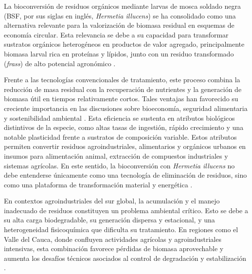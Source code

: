 La bioconversión de residuos orgánicos mediante larvas de mosca soldado negra (BSF, por sus siglas en inglés, \textit{Hermetia illucens}) se ha consolidado como una alternativa relevante para la valorización de biomasa residual en esquemas de economía circular. Esta relevancia se debe a su capacidad para transformar sustratos orgánicos heterogéneos en productos de valor agregado, principalmente biomasa larval rica en proteínas y lípidos, junto con un residuo transformado (\textit{frass}) de alto potencial agronómico \parencite{surendraBioconversionOrganicWastes2016,bermudez-serranoComprehensiveUtilizationBlack2023,singhInclusiveApproachOrganic2019a}. 

Frente a las tecnologías convencionales de tratamiento, este proceso combina la reducción de masa residual con la recuperación de nutrientes y la generación de biomasa útil en tiempos relativamente cortos. Tales ventajas han favorecido su creciente importancia en las discusiones sobre bioeconomía, seguridad alimentaria y sostenibilidad ambiental \parencite{surendraBioconversionOrganicWastes2016,singhInclusiveApproachOrganic2019a}. Esta eficiencia se sustenta en atributos biológicos distintivos de la especie, como altas tasas de ingestión, rápido crecimiento y una notable plasticidad frente a sustratos de composición variable. Estos atributos permiten convertir residuos agroindustriales, alimentarios y orgánicos urbanos en insumos para alimentación animal, extracción de compuestos industriales y sistemas agrícolas. En este sentido, la bioconversión con \textit{Hermetia illucens} no debe entenderse únicamente como una tecnología de eliminación de residuos, sino como una plataforma de transformación material y energética \parencite{bermudez-serranoComprehensiveUtilizationBlack2023,elsayedConversionProteinrichWaste2024a,brunoValorizationOrganicWaste2025,surendraBioconversionOrganicWastes2016}.

En contextos agroindustriales del sur global, la acumulación y el manejo inadecuado de residuos constituyen un problema ambiental crítico. Esto se debe a su alta carga biodegradable, su generación dispersa y estacional, y una heterogeneidad fisicoquímica que dificulta su tratamiento. En regiones como el Valle del Cauca, donde confluyen actividades agrícolas y agroindustriales intensivas, esta combinación favorece pérdidas de biomasa aprovechable y aumenta los desafíos técnicos asociados al control de degradación y estabilización \parencite{lacknerAgriculturalWasteChallenges2025,ait-kaddourTransformingPlantbasedWaste2024a,nasereldeenBioconversionDifferentWaste2023}. 



